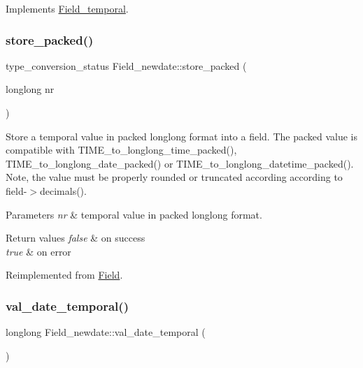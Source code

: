 Implements \mbox{\hyperlink{classField__temporal_a21c90848108fc5d00bad242efce2b490}{Field\+\_\+temporal}}.

\mbox{\label{classField__newdate_a4f741d8531290394ba08ee165498e830}} 
\subsubsection{\texorpdfstring{store\+\_\+packed()}{store\_packed()}}
{\footnotesize\ttfamily type\+\_\+conversion\+\_\+status Field\+\_\+newdate\+::store\+\_\+packed (\begin{DoxyParamCaption}\item[{longlong}]{nr }\end{DoxyParamCaption})\hspace{0.3cm}{\ttfamily [virtual]}}

Store a temporal value in packed longlong format into a field. The packed value is compatible with T\+I\+M\+E\+\_\+to\+\_\+longlong\+\_\+time\+\_\+packed(), T\+I\+M\+E\+\_\+to\+\_\+longlong\+\_\+date\+\_\+packed() or T\+I\+M\+E\+\_\+to\+\_\+longlong\+\_\+datetime\+\_\+packed(). Note, the value must be properly rounded or truncated according according to field-\/$>$decimals().


\begin{DoxyParams}{Parameters}
{\em nr} & temporal value in packed longlong format. \\
\hline
\end{DoxyParams}

\begin{DoxyRetVals}{Return values}
{\em false} & on success \\
\hline
{\em true} & on error \\
\hline
\end{DoxyRetVals}


Reimplemented from \mbox{\hyperlink{classField_a5c09752e8441d64ce2e4e611508bab7a}{Field}}.

\mbox{\label{classField__newdate_a06c3392cc8329a524f544360d789fc3d}} 
\subsubsection{\texorpdfstring{val\+\_\+date\+\_\+temporal()}{val\_date\_temporal()}}
{\footnotesize\ttfamily longlong Field\+\_\+newdate\+::val\+\_\+date\+\_\+temporal (\begin{DoxyParamCaption}{ }\end{DoxyParamCaption})\hspace{0.3cm}{\ttfamily [virtual]}}

